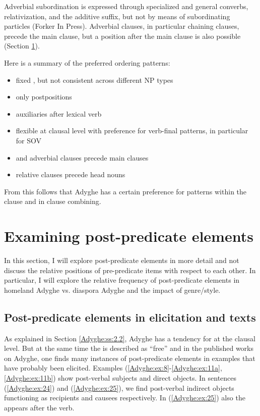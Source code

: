 \documentclass[output=paper,colorlinks,citecolor=brown, draft]{langscibook}
\begin{document}
Adverbial subordination is expressed through specialized and general converbs, relativization, and the additive suffix, but not by means of subordinating particles (Forker In Press). Adverbial clauses, in particular chaining clauses, precede the main clause, but a position after the main clause is also possible (Section \ref{Adyghe:ss:3}).

Here is a summary of the preferred ordering patterns:
\begin{itemize}
\item fixed , but not consistent across different NP types
\item only postpositions
\item auxiliaries after lexical verb
\item flexible  at clausal level with preference for verb-final patterns, in particular for SOV
\item {} and adverbial clauses precede main clauses
\item relative clauses precede head nouns
\end{itemize}

From this follows that Adyghe has a certain preference for  patterns within the clause and in clause combining. 

\section{Examining post-predicate elements}\label{Adyghe:ss:3}

In this section, I will explore post-predicate elements in more detail and not discuss the relative positions of pre-predicate items with respect to each other. In particular, I will explore the relative frequency of post-predicate elements in homeland Adyghe vs. diaspora Adyghe and the impact of genre/style.

\subsection{Post-predicate elements in elicitation and texts}\label{Adyghe:ss:3.1}

As explained in Section \ref{Adyghe:ss:2.2}, Adyghe has a tendency for   at the clausal level. But at the same time the  is described as ``free'' and in the published works on Adyghe, one finds many instances of post-predicate elements in examples that have probably been elicited. Examples (\ref{Adyghe:ex:8}-\ref{Adyghe:ex:11a}, \ref{Adyghe:ex:11b}) show post-verbal subjects and direct objects. In sentences (\ref{Adyghe:ex:24}) and (\ref{Adyghe:ex:25}), we find post-verbal indirect objects functioning as recipients and causees respectively. In (\ref{Adyghe:ex:25}) also the  appears after the verb. 
\end{document}
